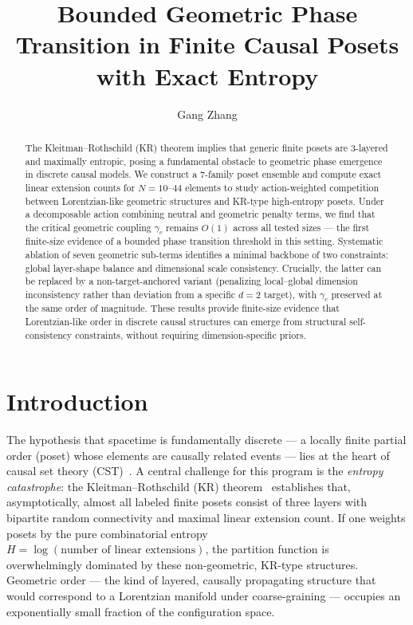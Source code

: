\documentclass[11pt,a4paper]{article}
\title{Bounded Geometric Phase Transition in Finite Causal Posets\\with Exact Entropy}
\author{Gang Zhang}
\date{}
\begin{document}
\maketitle

\begin{abstract}
The Kleitman--Rothschild (KR) theorem implies that generic finite posets are 3-layered and maximally entropic, posing a fundamental obstacle to geometric phase emergence in discrete causal models. We construct a 7-family poset ensemble and compute exact linear extension counts for $N = 10$--$44$ elements to study action-weighted competition between Lorentzian-like geometric structures and KR-type high-entropy posets. Under a decomposable action combining neutral and geometric penalty terms, we find that the critical geometric coupling $\gamma_c$ remains $O(1)$ across all tested sizes --- the first finite-size evidence of a bounded phase transition threshold in this setting. Systematic ablation of seven geometric sub-terms identifies a minimal backbone of two constraints: global layer-shape balance and dimensional scale consistency. Crucially, the latter can be replaced by a non-target-anchored variant (penalizing local--global dimension inconsistency rather than deviation from a specific $d = 2$ target), with $\gamma_c$ preserved at the same order of magnitude. These results provide finite-size evidence that Lorentzian-like order in discrete causal structures can emerge from structural self-consistency constraints, without requiring dimension-specific priors.
\end{abstract}

\section{Introduction}

The hypothesis that spacetime is fundamentally discrete --- a locally finite partial order (poset) whose elements are causally related events --- lies at the heart of causal set theory (CST)~\cite{bombelli1987,sorkin2005}. A central challenge for this program is the \emph{entropy catastrophe}: the Kleitman--Rothschild (KR) theorem~\cite{kleitman1975} establishes that, asymptotically, almost all labeled finite posets consist of three layers with bipartite random connectivity and maximal linear extension count. If one weights posets by the pure combinatorial entropy $H = \log(\text{number of linear extensions})$, the partition function is overwhelmingly dominated by these non-geometric, KR-type structures. Geometric order --- the kind of layered, causally propagating structure that would correspond to a Lorentzian manifold under coarse-graining --- occupies an exponentially small fraction of the configuration space.
\end{document}
